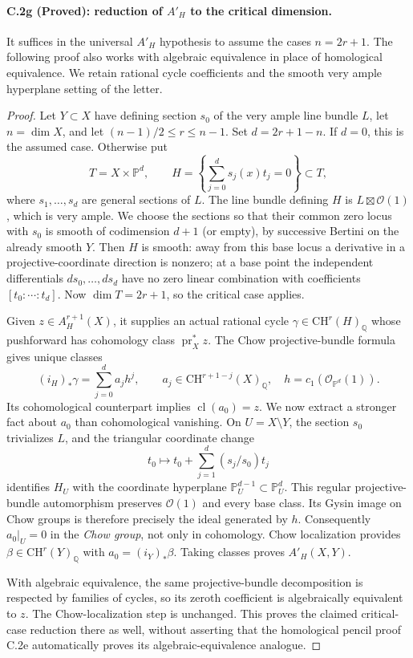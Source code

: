 \paragraph{C.2g (Proved): reduction of $A'_H$ to the critical dimension.}
It suffices in the universal $A'_H$ hypothesis to assume the cases
$n=2r+1$. The following proof also works with algebraic equivalence
in place of homological equivalence. We retain rational cycle
coefficients and the smooth very ample hyperplane setting of the
letter.

\begin{proof}
Let $Y\subset X$ have defining section $s_0$ of the very ample line
bundle $L$, let $n=\dim X$, and let $(n-1)/2\le r\le n-1$.
Set $d=2r+1-n$. If $d=0$, this is the assumed case. Otherwise put
\[
 T=X\times\mathbb P^d,\qquad
 H=\left\{\sum_{j=0}^d s_j(x)t_j=0\right\}\subset T,
\]
where $s_1,\ldots,s_d$ are general sections of $L$.
The line bundle defining $H$ is $L\boxtimes\mathcal O(1)$, which
is very ample. We choose the sections so that their common zero
locus with $s_0$ is smooth of codimension $d+1$ (or empty), by
successive Bertini on the already smooth $Y$. Then $H$ is smooth:
away from this base locus a derivative in a projective-coordinate
direction is nonzero; at a base point the independent differentials
$ds_0,\ldots,ds_d$ have no zero linear combination with coefficients
$[t_0:\cdots:t_d]$. Now $\dim T=2r+1$, so the critical case applies.

Given $z\in A_H^{r+1}(X)$, it supplies an actual rational cycle
$\gamma\in\mathrm{CH}^r(H)_{\mathbb Q}$ whose pushforward has
cohomology class $\operatorname{pr}_X^*z$. The Chow projective-bundle
formula gives unique classes
\[
 (i_H)_*\gamma=\sum_{j=0}^d a_j h^j,
 \qquad a_j\in\mathrm{CH}^{r+1-j}(X)_{\mathbb Q},
 \quad h=c_1(\mathcal O_{\mathbb P^d}(1)).
\]
Its cohomological counterpart implies $\operatorname{cl}(a_0)=z$.
We now extract a stronger fact about $a_0$ than cohomological
vanishing. On $U=X\setminus Y$, the section $s_0$ trivializes $L$,
and the triangular coordinate change
\[
 t_0\longmapsto t_0+\sum_{j=1}^d(s_j/s_0)t_j
\]
identifies $H_U$ with the coordinate hyperplane
$\mathbb P^{d-1}_U\subset\mathbb P^d_U$.
This regular projective-bundle automorphism preserves
$\mathcal O(1)$ and every base class. Its Gysin image on Chow groups
is therefore precisely the ideal generated by $h$.
Consequently $a_0|_U=0$ in the \emph{Chow group}, not only in
cohomology. Chow localization provides
$\beta\in\mathrm{CH}^r(Y)_{\mathbb Q}$ with $a_0=(i_Y)_*\beta$.
Taking classes proves $A'_H(X,Y)$.

With algebraic equivalence, the same projective-bundle decomposition
is respected by families of cycles, so its zeroth coefficient is
algebraically equivalent to $z$. The Chow-localization step is
unchanged. This proves the claimed critical-case reduction there
as well, without asserting that the homological pencil proof
C.2e automatically proves its algebraic-equivalence analogue.
\end{proof}

